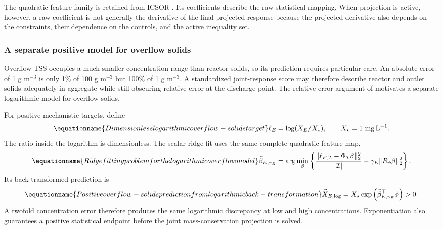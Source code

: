 The quadratic feature family is retained from ICSOR \citep{Selerio2026}. Its coefficients describe the raw statistical mapping. When projection is active, however, a raw coefficient is not generally the derivative of the final projected response because the projected derivative also depends on the constraints, their dependence on the controls, and the active inequality set.

\subsubsection{A separate positive model for overflow solids}

Overflow TSS occupies a much smaller concentration range than reactor solids, so its prediction requires particular care. An absolute error of 1 g m$^{-3}$ is only 1\% of 100 g m$^{-3}$ but 100\% of 1 g m$^{-3}$. A standardized joint-response score may therefore describe reactor and outlet solids adequately in aggregate while still obscuring relative error at the discharge point. The relative-error argument of \citet{Tofallis2015} motivates a separate logarithmic model for overflow solids.

For positive mechanistic targets, define
\begin{equation}
\equationname{Dimensionless logarithmic overflow-solids target}
\ell_E=\log(X_E/X_\star),\qquad X_\star=1\ \mathrm{mg\,L^{-1}}.
\label{eq:plant_log_target}
\end{equation}
The ratio inside the logarithm is dimensionless. The scalar ridge fit uses the same complete quadratic feature map,
\begin{equation}
\equationname{Ridge fitting problem for the logarithmic overflow model}
\widehat\beta_{E,\gamma_E}=\arg\min_\beta
\left\{\frac{\|\ell_{E,\mathcal I}-\Phi_{\mathcal I}\beta\|_2^2}{|\mathcal I|}
+\gamma_E\|R_\phi\beta\|_2^2\right\}.
\end{equation}
Its back-transformed prediction is
\begin{equation}
\equationname{Positive overflow-solids prediction from logarithmic back-transformation}
\widehat X_{E,\log}=X_\star\exp\left(\widehat\beta_{E,\gamma_E}^\top\phi\right)>0.
\label{eq:plant_log_prediction}
\end{equation}
A twofold concentration error therefore produces the same logarithmic discrepancy at low and high concentrations. Exponentiation also guarantees a positive statistical endpoint before the joint mass-conservation projection is solved.

